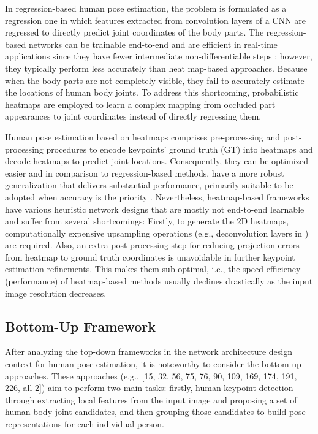 In regression-based human pose estimation, the problem is formulated as a regression one in which features extracted from convolution layers of a CNN are regressed to directly predict joint coordinates of the body parts. The regression-based networks can be trainable end-to-end and are efficient in real-time applications since they have fewer intermediate non-differentiable steps \cite{liu_cascaded_2018, eichner_human_2012, felzenszwalb_pictorial_2005, girdhar_detect-and-track_2018}; however, they typically perform less accurately than heat map-based approaches. Because when the body parts are not completely visible, they fail to accurately estimate the locations of human body joints. To address this shortcoming, probabilistic heatmaps are employed to learn a complex mapping from occluded part appearances to joint coordinates instead of directly regressing them. 

Human pose estimation based on heatmaps comprises pre-processing and post-processing procedures to encode keypoints' ground truth (GT) into heatmaps and decode heatmaps to predict joint locations. Consequently, they can be optimized easier and in comparison to regression-based methods, have a more robust generalization that delivers substantial performance, primarily suitable to be adopted when accuracy is the priority \cite{pfister_flowing_2015}. Nevertheless, heatmap-based frameworks have various heuristic network designs that are mostly not end-to-end learnable and suffer from several shortcomings: Firstly, to generate the 2D heatmaps, computationally expensive upsampling operations (e.g., deconvolution layers in \cite{yixing_gao_user_2015}) are required. Also, an extra post-processing step for reducing projection errors from heatmap to ground truth coordinates is unavoidable in further keypoint estimation refinements. This makes them sub-optimal, i.e., the speed efficiency (performance) of heatmap-based methods usually declines drastically as the input image resolution decreases. 

\subsection{Bottom-Up Framework}
 
After analyzing the top-down frameworks in the network architecture design context for human pose estimation, it is noteworthy to consider the bottom-up approaches. These approaches (e.g., [15, 32, 56, 75, 76, 90, 109, 169, 174, 191, 226, all 2]) aim to perform two main tasks: firstly, human keypoint detection through extracting local features from the input image and proposing a set of human body joint candidates, and then grouping those candidates to build pose representations for each individual person. 

